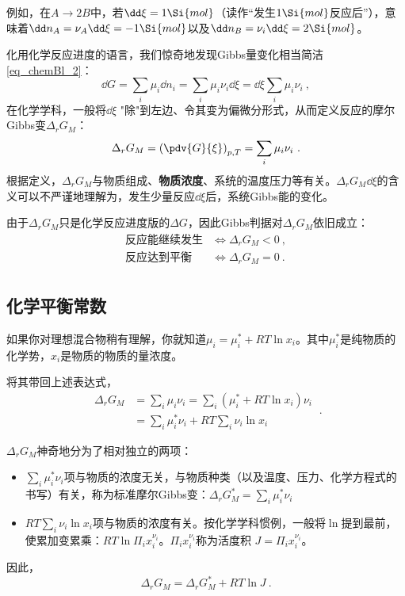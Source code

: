 例如，在$A\to2B$中，若$\dd \xi=1 \Si{mol}$（读作“发生$1 \Si{mol}$反应后”），意味着$\dd n_A = \nu_A \dd \xi = - 1 \Si{mol}$以及$\dd n_B = \nu_i \dd \xi = 2 \Si{mol}$。

化用化学反应进度的语言，我们惊奇地发现Gibbs量变化相当简洁\autoref{eq_chemBl_2}：
\begin{equation}
\dd G = \sum_i \mu_i \dd n_i = \sum_i \mu_i \nu_i \dd \xi =  \dd \xi \sum_i \mu_i \nu_i~,
\end{equation}
在化学学科，一般将$\dd \xi$ "除"到左边、令其变为偏微分形式，从而定义反应的摩尔Gibbs变$\Delta_r G_M$：
\begin{equation}
\Delta_r G_M = \left(\pdv{G}{\xi}\right)_{p,T} = \sum_i \mu_i \nu_i~.
\end{equation}
根据定义，$\Delta_r G_M$与物质组成、\textbf{物质浓度}、系统的温度压力等有关。$\Delta_r G_M \dd \xi$的含义可以不严谨地理解为，发生少量反应$\dd \xi$后，系统Gibbs能的变化。

由于$\Delta_r G_M$只是化学反应进度版的$\Delta G$，因此Gibbs判据对$\Delta_r G_M$依旧成立：
\begin{equation}
\begin{aligned}
\text{反应能继续发生} &\Longleftrightarrow \Delta_r G_M < 0~,\\
\text{反应达到平衡} &\Longleftrightarrow \Delta_r G_M = 0~.\\
\end{aligned}
\end{equation}

\subsection{化学平衡常数}
如果你对理想混合物稍有理解，你就知道$\mu_i = \mu_i^* + RT \ln x_i$。其中$\mu_i^*$是纯物质的化学势，$x_i$是物质的物质的量浓度。

将其带回上述表达式，
\begin{equation}
\begin{aligned}
\Delta_r G_M &= \sum_i \mu_i \nu_i = \sum_i (\mu_i^* + RT \ln x_i) \nu_i\\
&= \sum_i \mu_i^* \nu_i + RT \sum_i \nu_i \ln x_i
\end{aligned}~.
\end{equation}

$\Delta_r G_M$神奇地分为了相对独立的两项：
\begin{itemize}
\item $\sum_i \mu_i^* \nu_i$项与物质的浓度无关，与物质种类（以及温度、压力、化学方程式的书写）有关，称为标准摩尔Gibbs变：$\Delta_r G_M^* = \sum_i \mu_i^* \nu_i$
\item $RT \sum_i \nu_i \ln x_i$项与物质的浓度有关。按化学学科惯例，一般将$\ln$提到最前，使累加变累乘：$RT \ln \Pi_i x_i^{\nu_i}$。$\Pi_i x_i^{\nu_i}$称为活度积 $J=\Pi_i x_i^{\nu_i}$。
\end{itemize}
因此，\begin{equation}
\Delta_r G_M = \Delta_r G_M^* + RT \ln J~.
\end{equation}

